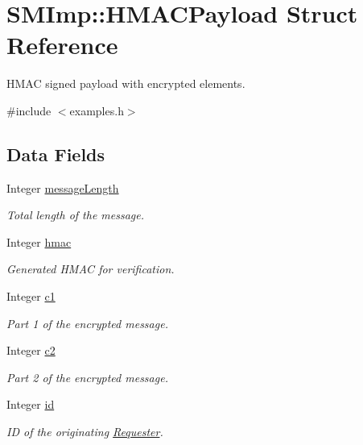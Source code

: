 \hypertarget{structSMImp_1_1HMACPayload}{}\section{S\+M\+Imp\+:\+:H\+M\+A\+C\+Payload Struct Reference}
\label{structSMImp_1_1HMACPayload}


H\+M\+AC signed payload with encrypted elements.  




{\ttfamily \#include $<$examples.\+h$>$}

\subsection*{Data Fields}
\begin{DoxyCompactItemize}
\item 
Integer \hyperlink{structSMImp_1_1HMACPayload_a43ba32c0eb4fd4bd21de24aed393a0ae}{message\+Length}
\begin{DoxyCompactList}\small\item\em Total length of the message. \end{DoxyCompactList}\item 
Integer \hyperlink{structSMImp_1_1HMACPayload_a9c5590cfd65a39f500552ea95b583241}{hmac}
\begin{DoxyCompactList}\small\item\em Generated H\+M\+AC for verification. \end{DoxyCompactList}\item 
Integer \hyperlink{structSMImp_1_1HMACPayload_aa28e06eeacc346a1add298357a8b7fb9}{c1}
\begin{DoxyCompactList}\small\item\em Part 1 of the encrypted message. \end{DoxyCompactList}\item 
Integer \hyperlink{structSMImp_1_1HMACPayload_aeb2e7ef7dfeda975882a42aab9c0652f}{c2}
\begin{DoxyCompactList}\small\item\em Part 2 of the encrypted message. \end{DoxyCompactList}\item 
Integer \hyperlink{structSMImp_1_1HMACPayload_ab79ad3d823f9477a652bfd9b92f3c15b}{id}
\begin{DoxyCompactList}\small\item\em ID of the originating \hyperlink{classSMImp_1_1Requester}{Requester}. \end{DoxyCompactList}\item 

\end{DoxyCompactItemize}
